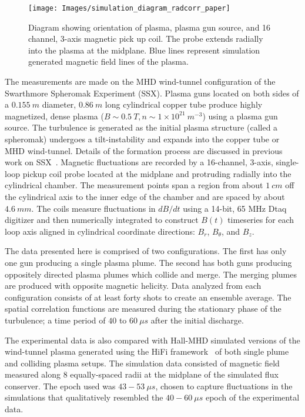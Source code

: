 \documentclass[aip,prl,amsmath,amssymb,reprint,superscriptaddress]{revtex4-1} %
\begin{document}
\begin{figure}[!htbp]
\centerline{
\texttt{[image: Images/simulation\_diagram\_radcorr\_paper]}}
\caption{\label{fig:chamber} Diagram showing orientation of plasma, plasma gun source, and 16 channel, 3-axis magnetic pick up coil. The probe extends radially into the plasma at the midplane. Blue lines represent simulation generated magnetic field lines of the plasma.}
\end{figure}


The measurements are made on the MHD wind-tunnel configuration of the Swarthmore Spheromak Experiment (SSX). Plasma guns located on both sides of a $0.155~m$ diameter, $0.86~m$ long cylindrical copper tube produce highly magnetized, dense plasma ($B \sim 0.5~T, n \sim 1\times 10^{21}~m^{-3}$) using a plasma gun source. The turbulence is generated as the initial plasma structure (called a spheromak) undergoes a tilt-instability and expands into the copper tube or MHD wind-tunnel. Details of the formation process are discussed in previous work on SSX~\cite{schaffner14a,schaffner14b}. Magnetic fluctuations are recorded by a 16-channel, 3-axis, single-loop pickup coil probe located at the midplane and protruding radially into the cylindrical chamber. The measurement points span a region from about $1~cm$ off the cylindrical axis to the inner edge of the chamber and are spaced by about $4.6~mm$. The coils measure fluctuations in $dB/dt$ using a 14-bit, 65 MHz Dtaq digitizer and then numerically integrated to construct $B(t)$ timeseries for each loop axis aligned in cylindrical coordinate directions: $B_{r}$, $B_{\theta}$, and $B_{z}$.

The data presented here is comprised of two configurations. The first has only one gun producing a single plasma plume. The second has both guns producing oppositely directed plasma plumes which collide and merge. The merging plumes are produced with opposite magnetic helicity. Data analyzed from each configuration consists of at least forty shots to create an ensemble average. The spatial correlation functions are measured during the stationary phase of the turbulence; a time period of $40$ to $60~\mu s$ after the initial discharge. 

The experimental data is also compared with Hall-MHD simulated versions of the wind-tunnel plasma generated using the HiFi framework~\cite{schaffner14a} of both single plume and colliding plasma setups. The simulation data consisted of magnetic field measured along 8 equally-spaced radii at the midplane of the simulated flux conserver. The epoch used was $43-53~ \mu s$, chosen to capture fluctuations in the simulations that qualitatively resembled the $40-60\ \mu s$ epoch of the experimental data. 
\end{document}
